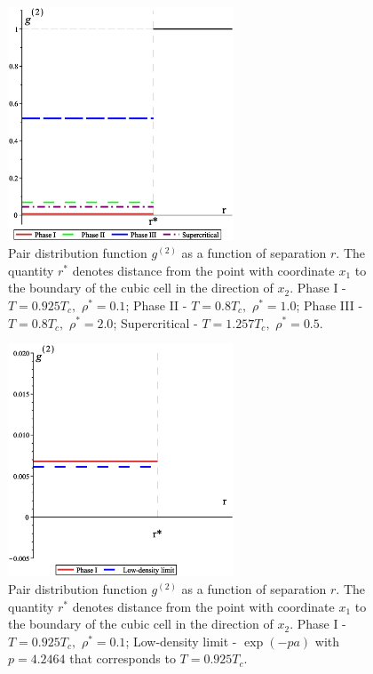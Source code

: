 \begin{figure}[htbp]
	\includegraphics[width=0.6\textwidth,angle=0]{g2_vs_r}
	\caption{Pair distribution function $g^{(2)}$ as a function of separation $r$. The quantity $r^*$ denotes distance from the point with coordinate $x_1$ to the boundary of the cubic cell in the direction of $x_2$. Phase I - $T = 0.925T_c,$ $\rho^*=0.1$; Phase II - $T = 0.8T_c,$ $\rho^* = 1.0$; Phase III - $T = 0.8T_c,$ $\rho^* = 2.0$; Supercritical - $T = 1.257T_c,$ $\rho^* = 0.5$.}
	\label{fig:g2_r}
\end{figure}

\begin{figure}[htbp]
	\includegraphics[width=0.6\textwidth,angle=0]{g2_vs_r_low_dens}
	\caption{Pair distribution function $g^{(2)}$ as a function of separation $r$. The quantity $r^*$ denotes distance from the point with coordinate $x_1$ to the boundary of the cubic cell in the direction of $x_2$. Phase I - $T = 0.925T_c,$ $\rho^*=0.1$; Low-density limit - $\exp(-pa)$ with $p=4.2464$ that corresponds to $T = 0.925T_c$.}
	\label{fig:g2_r_low_dens}
\end{figure}

